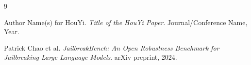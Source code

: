 \documentclass[10pt, a4paper, twocolumn]{article}
\begin{document}


\begin{thebibliography}{9}

Author Name(s) for HouYi.
\textit{Title of the HouYi Paper}.
Journal/Conference Name, Year.

Patrick Chao et al.
\textit{JailbreakBench: An Open Robustness Benchmark for Jailbreaking Large Language Models}.
arXiv preprint, 2024.

\end{thebibliography}
\end{document}
